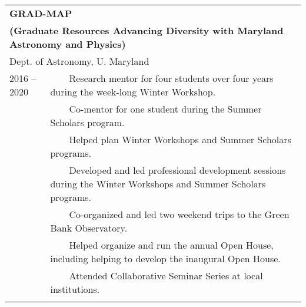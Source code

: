 \documentclass[11pt]{article}
\makeatletter
\newcommand{\tabitem}{~~\llap{\textbullet}~~}
\def\vhrulefill#1{\leavevmode\leaders\hrule\@height#1\hfill \kern\z@}
\makeatother
\begin{document}
\begin{longtable}{p{} p{}}
\multicolumn{2}{l}{\bf GRAD-MAP} \vhrulefill{0.5pt}\\
\multicolumn{2}{l}{\bf \small{(Graduate Resources Advancing Diversity with Maryland Astronomy and Physics)}}\\
\multicolumn{2}{l}{Dept. of Astronomy, U. Maryland} \smallskip \\
2016 -- 2020 & \tabitem Research mentor for four students over four years during the week-long Winter Workshop.\\
& \tabitem Co-mentor for one student during the Summer Scholars program.\\
& \tabitem Helped plan Winter Workshops and Summer Scholars programs.\\
& \tabitem Developed and led professional development sessions during the Winter Workshops and Summer Scholars programs.\\
& \tabitem Co-organized and led two weekend trips to the Green Bank Observatory.\\
& \tabitem Helped organize and run the annual Open House, including helping to develop the inaugural Open House.\\
& \tabitem Attended Collaborative Seminar Series at local institutions. \\
& \\


\end{longtable}
\end{document}
